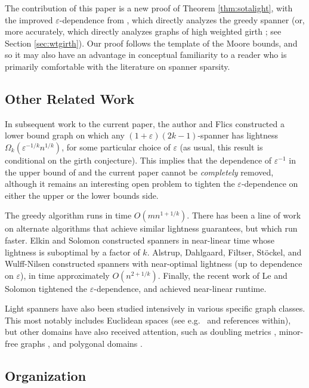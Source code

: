 \documentclass{theoretics}
\newcommand{\eps}{\varepsilon}
\begin{document}
The contribution of this paper is a new proof of Theorem \ref{thm:sotalight}, with the improved $\eps$-dependence from \cite{LS23}, which directly analyzes the greedy spanner (or, more accurately, which directly analyzes graphs of high weighted girth \cite{ENS15}; see Section \ref{sec:wtgirth}).
Our proof follows the template of the Moore bounds, and so it may also have an advantage in conceptual familiarity to a reader who is primarily comfortable with the literature on spanner sparsity.

\subsection{Other Related Work}

In subsequent work to the current paper, the author and Flics \cite{BF24} constructed a lower bound graph on which any $(1+\eps)(2k-1)$-spanner has lightness $\Omega_k(\eps^{-1/k} n^{1/k})$, for some particular choice of $\eps$ (as usual, this result is conditional on the girth conjecture).
This implies that the dependence of $\eps^{-1}$ in the upper bound of \cite{LS23} and the current paper cannot be \emph{completely} removed, although it remains an interesting open problem to tighten the $\eps$-dependence on either the upper or the lower bounds side.

The greedy algorithm runs in time $O(mn^{1+1/k})$.
There has been a line of work on alternate algorithms that achieve similar lightness guarantees, but which run faster.
Elkin and Solomon \cite{ES16} constructed spanners in near-linear time whose lightness is suboptimal by a factor of $k$.
Alstrup, Dahlgaard, Filtser, St\"{o}ckel, and Wulff-Nilsen \cite{ADFSW22} constructed spanners with near-optimal lightness (up to dependence on $\eps$), in time approximately $O(n^{2 + 1/k})$.
Finally, the recent work of Le and Solomon \cite{LS23} tightened the $\eps$-dependence, and achieved near-linear runtime.

Light spanners have also been studied intensively in various specific graph classes.
This most notably includes Euclidean spaces (see e.g.\ \cite{FS20, LS23, NS07, ES15} and references within), but other domains have also received attention, such as doubling metrics \cite{KLMS22, LT24, BLW19, CLNS15, CLN15, CG09, GR08}, minor-free graphs \cite{BLW17}, and polygonal domains \cite{BKKLLPT24}.

\subsection{Organization}
\end{document}
